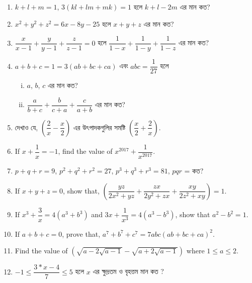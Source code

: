 \documentclass[11pt, a4paper]{article}
\begin{document}
\begin{enumerate}
	\item $k+l+m = 1$, $3(kl+lm+mk) = 1$ \textbengali{হলে} $k+l-2m$ \textbengali{এর মান কত?}
	
	\item $x^2 + y^2 + z^2 = 6x - 8y - 25$ \textbengali{হলে} $x+y+z$ \textbengali{এর মান কত?}
	
	\item $ \dfrac{x}{x-1} + \dfrac{y}{y-1} + \dfrac{z}{z-1} = 0 $ \textbengali{হলে} $ \dfrac{1}{1-x} + \dfrac{1}{1-y} + \dfrac{1}{1-z} $ \textbengali{এর মান কত?}
	
	\item $ a+b+c = 1 = 3(ab+bc+ca) $ \textbengali{এবং} $abc = \dfrac{1}{27}$ \textbengali{হলে}
	\begin{enumerate}[(i)]
		\item $a$, $b$, $c$ \textbengali{এর মান কত?}
		\item $\dfrac{a}{b+c} + \dfrac{b}{c+a} + \dfrac{c}{a+b}$ \textbengali{এর মান কত?}
	\end{enumerate}
	
	\item \textbengali{দেখাও যে,} $ \left( \dfrac{2}{x} - \dfrac{x}{2} \right) $ \textbengali{এর উৎপাদকগুলির সমষ্টি} $ \left( \dfrac{x}{2} + \dfrac{2}{x} \right) $.
	
	\item If $ x + \dfrac{1}{x} = -1 $, find the value of $ x^{2017} + \dfrac{1}{x^{2017}} $.
	
	\item $ p+q+r = 9 $, $ p^2 + q^2 + r^2 = 27 $, $ p^3 + q^3 + r^3 = 81 $, $ pqr $ = \textbengali{কত?}
	
	\item If $ x+y+z = 0 $, show that, $ \left( \dfrac{yz}{2x^2 + yz} + \dfrac{zx}{2y^2 + zx} + \dfrac{xy}{2z^2 + xy} \right) = 1 $.
	
	\item If $ x^3 + \dfrac{3}{x} = 4(a^3 + b^3) $ and $ 3x + \dfrac{1}{x^3} = 4(a^3 - b^3) $, show that $a^2 - b^2 = 1$.
	
	
	\item If $ a+b+c = 0 $, prove that, $ a^7 + b^7 + c^7 = 7abc(ab+bc+ca)^2 $.	
	
	\item Find the value of $\left( \sqrt{a-2\sqrt{a-1}} - \sqrt{a+2\sqrt{a-1}} \right)$ where $1 \leq a \leq 2$.
	
	\item $-1 \leq \dfrac{3*x - 4}{7} \leq 5$ \textbengali{হলে} $x$ \textbengali{এর ক্ষুদ্রতম ও বৃহত্তম মান কত ?}
	

\end{enumerate}
\end{document}
